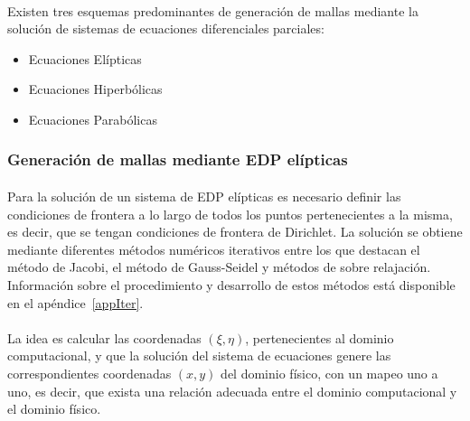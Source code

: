 \documentclass[letterpaper, openright, 12pt]{book}
\begin{document}
    \paragraph*{}
    Existen tres esquemas predominantes de generación de mallas mediante la
    solución de sistemas de ecuaciones diferenciales parciales:
    \begin{itemize}
        \item Ecuaciones Elípticas
        \item Ecuaciones Hiperbólicas
        \item Ecuaciones Parabólicas
    \end{itemize}

    \subsubsection{Generación de mallas mediante EDP elípticas}
    \paragraph*{}
    Para la solución de un sistema de EDP elípticas es necesario definir las
    condiciones de frontera a lo largo de todos los puntos pertenecientes a la
    misma, es decir, que se tengan condiciones de frontera de Dirichlet.
    La solución se obtiene mediante diferentes métodos numéricos iterativos
    entre los que destacan el método de Jacobi, el método de Gauss-Seidel y
    métodos de sobre relajación. Información sobre el procedimiento y
    desarrollo de estos métodos está disponible en el apéndice~\ref{appIter}.

    \paragraph*{}
    La idea es calcular las coordenadas $(\xi, \eta)$, pertenecientes al
    dominio computacional, y que la solución del sistema de ecuaciones genere
    las correspondientes coordenadas $(x, y)$ del dominio físico, con un mapeo
    uno a uno, es decir, que exista una relación adecuada entre el dominio
    computacional y el dominio físico.
\end{document}
